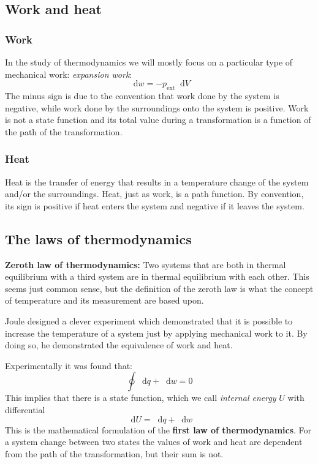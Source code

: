 \documentclass[12pt,a4paper]{report}
\newcommand*\diff{\mathop{}\!\mathrm{d}}
\begin{document}
   \subsection*{Work and heat}
   \subsubsection*{Work}
   In the study of thermodynamics we will mostly focus on a particular type of mechanical work: \textit{expansion work}:
   \begin{equation*}
   \diff w=-p_{\mathrm{ext}}\diff V
   \end{equation*}
   The minus sign is due to the convention that work done by the system is negative, while work done by the surroundings onto the system is positive. Work is not a state function and its total value during a transformation is a function of the path of the transformation.
   \subsubsection*{Heat}
   Heat is the transfer of energy that results in a temperature change of the system and/or the surroundings. 
   Heat, just as work, is a path function. By convention, its sign is positive if heat enters the system and negative if it leaves the system.
   \subsection*{The laws of thermodynamics}
   \textbf{Zeroth law of thermodynamics:} Two systems that are both in thermal equilibrium with a third system are in thermal equilibrium with each other. This seems just common sense, but the definition of the zeroth law is what the concept of temperature and its measurement are based upon.
   
   Joule designed a clever experiment which demonstrated that it is possible to increase the temperature of a system just by applying mechanical work to it. By doing so, he demonstrated the equivalence of work and heat.
   
   Experimentally it was found that:
   \begin{equation*}
   \oint\diff q+\diff w=0
   \end{equation*}
   This implies that there is a state function, which we call \textit{internal energy} $U$ with differential 
   \begin{equation*}
   \diff U=\diff q+\diff w
   \end{equation*}
   This is the mathematical formulation of the \textbf{first law of thermodynamics}.
   For a system change between two states the values of work and heat are dependent from the path of the transformation, but their sum is not. 
    
\end{document}
